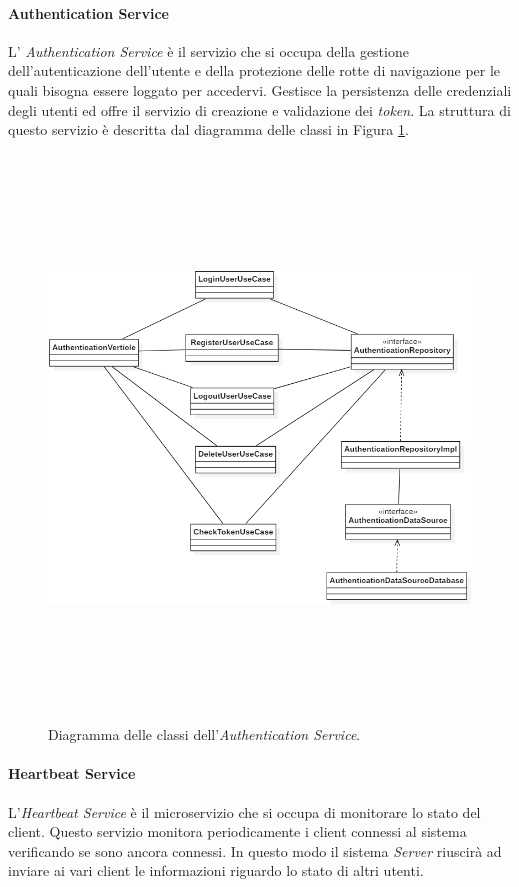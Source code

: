 \paragraph{Authentication Service}
L' \textit{Authentication Service} è il servizio che si occupa della gestione dell'autenticazione dell'utente e della protezione delle rotte di navigazione per le quali bisogna essere loggato per accedervi. Gestisce la persistenza delle credenziali degli utenti ed offre il servizio di creazione e validazione dei \textit{token}.
La struttura di questo servizio è descritta dal diagramma delle classi in Figura \ref{fig:authentication-service-class-diagram}.
\begin{figure}
  \centering
  \includegraphics[height=15cm, width=12cm,
		keepaspectratio]{images/AuthenticationServiceClassDiagram.png}
  \caption{Diagramma delle classi dell'\textit{Authentication Service}.}
  \label{fig:authentication-service-class-diagram}
\end{figure}

\paragraph{Heartbeat Service}
L'\textit{Heartbeat Service} è il microservizio che si occupa di monitorare lo stato del client. Questo servizio monitora periodicamente i client connessi al sistema verificando se sono ancora connessi. In questo modo il sistema \textit{Server} riuscirà ad inviare ai vari client le informazioni riguardo lo stato di altri utenti.

